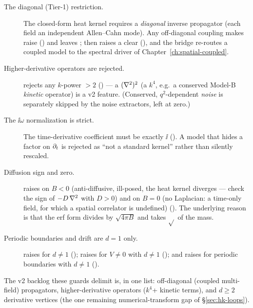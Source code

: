 \begin{description}
  \item[The diagonal (Tier-1) restriction.] The closed-form heat kernel requires
        a \emph{diagonal} inverse propagator (each field an independent
        Allen--Cahn mode). Any off-diagonal coupling makes
         raise
        () and leaves ;
         then raises a clear
         (), and
        the bridge re-routes a coupled model to the spectral driver of
        Chapter~\ref{ch:spatial-coupled}.
  \item[Higher-derivative operators are rejected.]
         rejects any $k$-power $>2$
        () --- a $(\nabla^2)^{2}$ (a $k^{4}$, e.g.\ a
        conserved Model-B \emph{kinetic} operator) is a v2 feature. (Conserved,
        $q^{2}$-dependent \emph{noise} is separately skipped by the noise
        extractors, left at zero.)
  \item[The $\ii\omega$ normalization is strict.] The time-derivative coefficient
        must be exactly $\ii$ (). A model that hides a
        factor on $\partial_t$ is rejected as ``not a standard \msrjd{} kernel'' rather
        than silently rescaled.
  \item[Diffusion sign and zero.] 
        raises on $B<0$ (anti-diffusive, ill-posed, the heat kernel diverges ---
        check the sign of $-D\,\nabla^2$ with $D>0$) and on $B=0$ (no Laplacian: a
        time-only field, for which a spatial correlator is undefined)
        (). The underlying reason is that
        the erf form divides by $\sqrt{4\pi B}$ and takes $\sqrt{}$ of the mass.
  \item[Periodic boundaries and drift are $d=1$ only.]  raises
        for $d\ne 1$ ();
         raises for $V\ne 0$ with $d\ne 1$
        (); and 
        raises for periodic boundaries with $d\ne 1$
        ().
\end{description}

The v2 backlog these guards delimit is, in one list: off-diagonal (coupled
multi-field) propagators, higher-derivative operators ($k^{4}$+ kinetic terms),
and $d\ge 2$ derivative vertices (the one remaining numerical-transform gap of
\S\ref{sec:hk-loops}).

